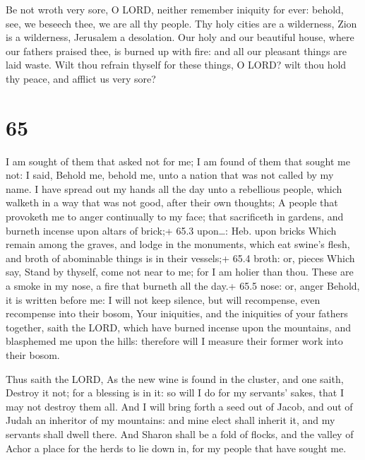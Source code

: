  Be not wroth very sore, O LORD, neither remember iniquity
for ever: behold, see, we beseech thee, we are all thy people.
 Thy holy cities are a wilderness, Zion is a wilderness,
Jerusalem a desolation.  Our holy and our beautiful house,
where our fathers praised thee, is burned up with fire: and all our
pleasant things are laid waste.  Wilt thou refrain thyself
for these things, O LORD? wilt thou hold thy peace, and afflict us very
sore?

\hypertarget{section-64}{%
\section{65}\label{section-64}}

 I am sought of them that asked not for me; I am found of
them that sought me not: I said, Behold me, behold me, unto a nation
that was not called by my name.  I have spread out my hands
all the day unto a rebellious people, which walketh in a way that was
not good, after their own thoughts;  A people that provoketh
me to anger continually to my face; that sacrificeth in gardens, and
burneth incense upon altars of brick;+ 65.3 upon\ldots: Heb. upon bricks
 Which remain among the graves, and lodge in the monuments,
which eat swine's flesh, and broth of abominable things is in their
vessels;+ 65.4 broth: or, pieces  Which say, Stand by
thyself, come not near to me; for I am holier than thou. These are a
smoke in my nose, a fire that burneth all the day.+ 65.5 nose: or, anger
 Behold, it is written before me: I will not keep silence,
but will recompense, even recompense into their bosom,  Your
iniquities, and the iniquities of your fathers together, saith the LORD,
which have burned incense upon the mountains, and blasphemed me upon the
hills: therefore will I measure their former work into their bosom.

 Thus saith the LORD, As the new wine is found in the
cluster, and one saith, Destroy it not; for a blessing is in it: so will
I do for my servants' sakes, that I may not destroy them all.
 And I will bring forth a seed out of Jacob, and out of
Judah an inheritor of my mountains: and mine elect shall inherit it, and
my servants shall dwell there.  And Sharon shall be a fold
of flocks, and the valley of Achor a place for the herds to lie down in,
for my people that have sought me.

